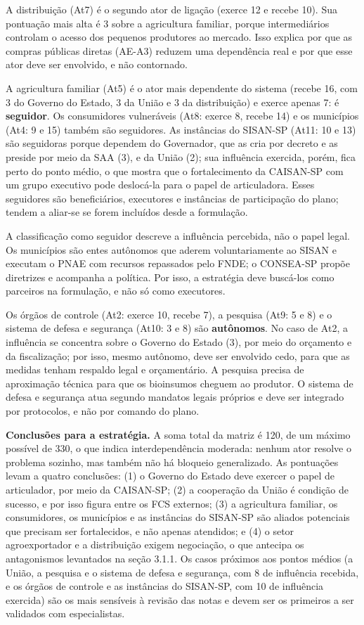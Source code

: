 \documentclass[
	12pt,				%
	openright,			%
	oneside,			%
	a4paper,			%
	chapter=TITLE,		%
	section=TITLE,		%
	english,			%
	french,				%
	spanish,			%
	brazil,				%
 ]{abntex2}
\begin{document}
A distribuição (At7) é o segundo ator de ligação (exerce 12 e recebe 10). Sua
pontuação mais alta é 3 sobre a agricultura familiar, porque intermediários
controlam o acesso dos pequenos produtores ao mercado. Isso explica por que as
compras públicas diretas (AE-A3) reduzem uma dependência real e por que esse
ator deve ser envolvido, e não contornado.

A agricultura familiar (At5) é o ator mais dependente do sistema (recebe 16,
com 3 do Governo do Estado, 3 da União e 3 da distribuição) e exerce apenas 7:
é \textbf{seguidor}. Os consumidores vulneráveis (At8: exerce 8, recebe 14) e
os municípios (At4: 9 e 15) também são seguidores. As instâncias do SISAN-SP
(At11: 10 e 13) são seguidoras porque dependem do Governador, que as cria por
decreto e as preside por meio da SAA (3), e da União (2); sua influência
exercida, porém, fica perto do ponto médio, o que mostra que o fortalecimento
da CAISAN-SP com um grupo executivo pode deslocá-la para o papel de
articuladora. Esses seguidores são beneficiários, executores e instâncias de
participação do plano; tendem a aliar-se se forem incluídos desde a
formulação.

A classificação como seguidor descreve a influência percebida, não o papel
legal. Os municípios são entes autônomos que aderem voluntariamente ao SISAN e
executam o PNAE com recursos repassados pelo FNDE; o CONSEA-SP propõe
diretrizes e acompanha a política. Por isso, a estratégia deve buscá-los como
parceiros na formulação, e não só como executores.

Os órgãos de controle (At2: exerce 10, recebe 7), a pesquisa (At9: 5 e 8) e o
sistema de defesa e segurança (At10: 3 e 8) são \textbf{autônomos}. No caso de
At2, a influência se concentra sobre o Governo do Estado (3), por meio do
orçamento e da fiscalização; por isso, mesmo autônomo, deve ser envolvido cedo,
para que as medidas tenham respaldo legal e orçamentário. A pesquisa precisa de
aproximação técnica para que os bioinsumos cheguem ao produtor. O sistema de
defesa e segurança atua segundo mandatos legais próprios e deve ser integrado
por protocolos, e não por comando do plano.

\textbf{Conclusões para a estratégia.} A soma total da matriz é 120, de um
máximo possível de 330, o que indica interdependência moderada: nenhum ator
resolve o problema sozinho, mas também não há bloqueio generalizado. As
pontuações levam a quatro conclusões: (1) o Governo do Estado deve exercer o
papel de articulador, por meio da CAISAN-SP; (2) a cooperação da União é
condição de sucesso, e por isso figura entre os FCS externos; (3) a agricultura
familiar, os consumidores, os municípios e as instâncias do SISAN-SP são aliados
potenciais que precisam ser fortalecidos, e não apenas atendidos; e (4) o setor
agroexportador e a distribuição exigem negociação, o que antecipa os
antagonismos levantados na seção 3.1.1. Os casos próximos aos pontos médios (a
União, a pesquisa e o sistema de defesa e segurança, com 8 de influência
recebida, e os órgãos de controle e as instâncias do SISAN-SP, com 10 de
influência exercida) são os mais sensíveis à revisão das notas e devem ser os
primeiros a ser validados com especialistas.
\end{document}
